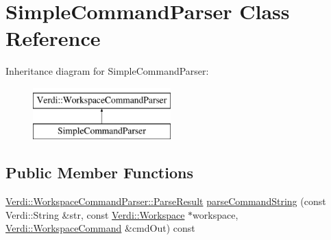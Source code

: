 \hypertarget{class_simple_command_parser}{\section{\-Simple\-Command\-Parser \-Class \-Reference}
\label{class_simple_command_parser}
}
\-Inheritance diagram for \-Simple\-Command\-Parser\-:\begin{figure}[H]
\begin{center}
\leavevmode
\includegraphics[height=2.000000cm]{class_simple_command_parser}
\end{center}
\end{figure}
\subsection*{\-Public \-Member \-Functions}
\begin{DoxyCompactItemize}
\item 
\hyperlink{class_verdi_1_1_workspace_command_parser_1_1_parse_result}{\-Verdi\-::\-Workspace\-Command\-Parser\-::\-Parse\-Result} \hyperlink{class_simple_command_parser_ac1aefd0da71364243b2e95e7af8198b8}{parse\-Command\-String} (const \-Verdi\-::\-String \&str, const \hyperlink{class_verdi_1_1_workspace}{\-Verdi\-::\-Workspace} $\ast$workspace, \hyperlink{class_verdi_1_1_workspace_command}{\-Verdi\-::\-Workspace\-Command} \&cmd\-Out) const 
\end{DoxyCompactItemize}


